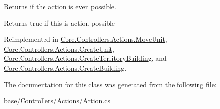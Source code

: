 Returns if the action is even possible. 

\begin{DoxyReturn}{Returns}
true if this is action possible
\end{DoxyReturn}


Reimplemented in \hyperlink{classCore_1_1Controllers_1_1Actions_1_1MoveUnit_a6689af13f9a2f8ff90ad72d2ac327a52}{Core.\+Controllers.\+Actions.\+Move\+Unit}, \hyperlink{classCore_1_1Controllers_1_1Actions_1_1CreateUnit_a30ceafb2aa0fb1b801a8abd659c9d70f}{Core.\+Controllers.\+Actions.\+Create\+Unit}, \hyperlink{classCore_1_1Controllers_1_1Actions_1_1CreateTerritoryBuilding_a972f538b1c4a17240b6d7f9d7e0b2662}{Core.\+Controllers.\+Actions.\+Create\+Territory\+Building}, and \hyperlink{classCore_1_1Controllers_1_1Actions_1_1CreateBuilding_a254e5f630e31046dfb9bdc5e8b25d7d9}{Core.\+Controllers.\+Actions.\+Create\+Building}.



The documentation for this class was generated from the following file\+:\begin{DoxyCompactItemize}
\item 
base/\+Controllers/\+Actions/Action.\+cs\end{DoxyCompactItemize}
